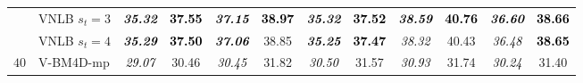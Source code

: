 \documentclass[10pt, a4paper]{article}
\newcommand{\best}[1]{#1}
\newcommand{\bsic}[1]{\textcolor{black}{\textit{#1}}}
\newcommand{\Bsic}[1]{\textcolor{black}{\textbf{\textit{#1}}}}
\newcommand{\Best}[1]{\textbf{\textcolor{black}{#1}}}
\begin{document}
\begin{table}[htp!]
\begin{center}
{\begin{tabular}{ c | l |c c | c c | c c | c c | c c}
			                      & VNLB   $s_t = 3$     & \Bsic{35.32} & \Best{37.55} & \Bsic{37.15} & \Best{38.97} & \Bsic{35.32} & \Best{37.52} & \Bsic{38.59} & \Best{40.76} & \Bsic{36.60} & \Best{38.66} \\
			                      & VNLB   $s_t = 4$     & \Bsic{35.29} & \Best{37.50} & \Bsic{37.06} & \best{38.85} & \Bsic{35.25} & \Best{37.47} & \bsic{38.32} & \best{40.43} & \bsic{36.48} & \Best{38.65} \\\hline
%
			\multirow{1}{*}{$40$}
			                      & V-BM4D-mp            & \bsic{29.07} &       30.46  & \bsic{30.45} &       31.82  & \bsic{30.50} &       31.57  & \bsic{30.93} &       31.74  & \bsic{30.24} &       31.40  \\

\end{tabular}}
\end{center}
\end{table}
\end{document}
